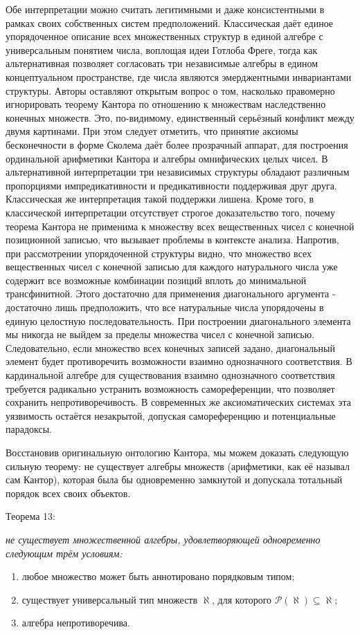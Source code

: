 \documentclass[12pt]{article}
\begin{document}
Обе интерпретации можно считать легитимными и даже консистентными в рамках своих собственных систем предположений. Классическая даёт единое упорядоченное описание всех множественных структур в единой алгебре с универсальным понятием числа, воплощая идеи Готлоба Фреге, тогда как альтернативная позволяет согласовать три независимые алгебры в едином концептуальном пространстве, где числа являются эмерджентными инвариантами структуры. Авторы оставляют открытым вопрос о том, насколько правомерно игнорировать теорему Кантора по отношению к множествам наследственно конечных множеств. Это, по-видимому, единственный серьёзный конфликт между двумя картинами. При этом следует отметить, что принятие аксиомы бесконечности в форме Сколема даёт более прозрачный аппарат, для построения ординальной арифметики Кантора и алгебры омнифических целых чисел. В альтернативной интерпретации три независимых структуры обладают различным пропорциями импредикативности и предикативности поддерживая друг друга. Классическая же интерпретация такой поддержки лишена. Кроме того, в классической интерпретации отсутствует строгое доказательство того, почему теорема Кантора не применима к множеству всех вещественных чисел с конечной позиционной записью, что вызывает проблемы в контексте анализа. Напротив, при рассмотрении упорядоченной структуры видно, что множество всех вещественных чисел с конечной записью для каждого натурального числа уже содержит все возможные комбинации позиций вплоть до минимальной трансфинитной. Этого достаточно для применения диагонального аргумента - достаточно лишь предположить, что все натуральные числа упорядочены в единую целостную последовательность. При построении диагонального элемента мы никогда не выйдем за пределы множества чисел с конечной записью. Следовательно, если множество всех конечных записей задано, диагональный элемент будет противоречить возможности взаимно однозначного соответствия. В кардинальной алгебре для существования взаимно однозначного соответствия требуется радикально устранить возможность самореференции, что позволяет сохранить непротиворечивость. В современных же аксиоматических системах эта уязвимость остаётся незакрытой, допуская самореференцию и потенциальные парадоксы.

Восстановив оригинальную онтологию Кантора, мы можем доказать следующую сильную теорему: не существует алгебры множеств (арифметики, как её называл сам Кантор), которая была бы одновременно замкнутой и допускала тотальный порядок всех своих объектов.

Теорема 13:  {\sl не существует множественной алгебры, удовлетворяющей одновременно следующим трём условиям:
\begin{enumerate}
    \item любое множество может быть аннотировано порядковым типом;
    \item существует универсальный тип множеств $\aleph$, для которого $\mathcal{P}(\aleph) \subseteq \aleph$;
    \item алгебра непротиворечива.
\end{enumerate}}
\end{document}
